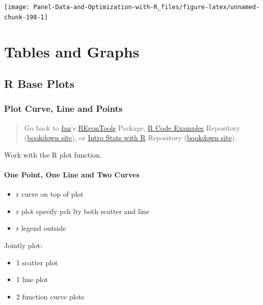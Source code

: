 \documentclass[
]{book}
\providecommand{\tightlist}{%
  \setlength{\itemsep}{0pt}\setlength{\parskip}{0pt}}
\begin{document}
\begin{center}\texttt{[image: Panel-Data-and-Optimization-with-R\_files/figure-latex/unnamed-chunk-198-1]} \end{center}

\hypertarget{tables-and-graphs}{%
\chapter{Tables and Graphs}\label{tables-and-graphs}}

\hypertarget{r-base-plots}{%
\section{R Base Plots}\label{r-base-plots}}

\hypertarget{plot-curve-line-and-points}{%
\subsection{Plot Curve, Line and Points}\label{plot-curve-line-and-points}}

\begin{quote}
Go back to \href{http://fanwangecon.github.io/}{fan}'s \href{https://fanwangecon.github.io/REconTools/}{REconTools} Package, \href{https://fanwangecon.github.io/R4Econ/}{R Code Examples} Repository (\href{https://fanwangecon.github.io/R4Econ/bookdown}{bookdown site}), or \href{https://fanwangecon.github.io/Stat4Econ/}{Intro Stats with R} Repository (\href{https://fanwangecon.github.io/Stat4Econ/bookdown}{bookdown site}).
\end{quote}

Work with the R plot function.

\hypertarget{one-point-one-line-and-two-curves}{%
\subsubsection{One Point, One Line and Two Curves}\label{one-point-one-line-and-two-curves}}

\begin{itemize}
\tightlist
\item
  r curve on top of plot
\item
  r plot specify pch lty both scatter and line
\item
  r legend outside
\end{itemize}

Jointly plot:

\begin{itemize}
\tightlist
\item
  1 scatter plot
\item
  1 line plot
\item
  2 function curve plots
\end{itemize}
\end{document}
